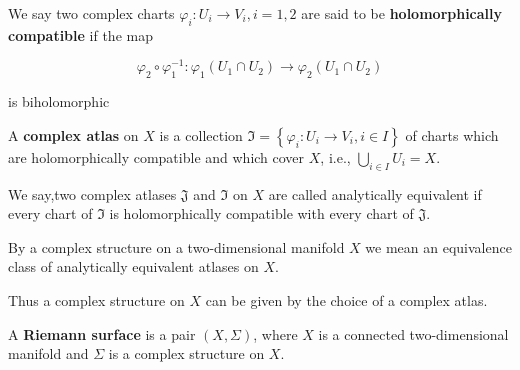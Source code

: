 \begin{definition}
    We say two complex charts $\varphi_{i}: U_{i} \rightarrow V_{i}, i=1,2$ are said to be \textbf{holomorphically compatible} if the map

$$
\varphi_{2} \circ \varphi_{1}^{-1}: \varphi_{1}\left(U_{1} \cap U_{2}\right) \rightarrow \varphi_{2}\left(U_{1} \cap U_{2}\right)
$$

is biholomorphic 
\end{definition}
\begin{definition}
    A \textbf{complex atlas} on $X$ is a collection  $\mathfrak{I}=\left\{\varphi_{i}: U_{i} \rightarrow V_{i}, i \in I\right\}$ of charts which are holomorphically compatible and which cover $X$, i.e., $\bigcup_{i \in I} U_{i}=X$. 

\end{definition}
\begin{definition}
    We say,two complex atlases $\mathfrak{J}$ and $\mathfrak{I}$ on $X$ are called analytically equivalent if every chart of $\mathfrak{I}$ is holomorphically compatible with every chart of $\mathfrak{J}$.
\end{definition}

\begin{definition}
    By a complex structure on a two-dimensional manifold $X$ we mean an equivalence class of analytically equivalent atlases on $X$.
\end{definition}
Thus a complex structure on $X$ can be given by the choice of a complex atlas.

\begin{definition}
    A \textbf{Riemann surface} is a pair $(X, \Sigma)$, where $X$ is a connected two-dimensional manifold and $\Sigma$ is a complex structure on $X$.

\end{definition}

